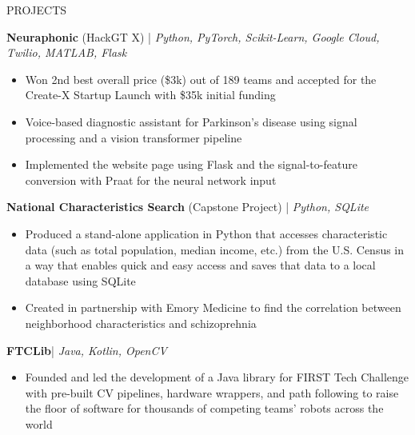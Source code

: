 \documentclass{resume} %
\begin{document}

\vspace{-0.8em}
\begin{rSection}{PROJECTS}
\vspace{-1.25em}
\item \textbf{Neuraphonic} (HackGT X) | \textit{Python, PyTorch, Scikit-Learn, Google Cloud, Twilio, MATLAB, Flask}
\vspace{-0.5em}
\begin{itemize}
   \itemsep -5pt {}
   \item Won 2nd best overall price (\$3k) out of 189 teams and accepted for the Create-X Startup Launch with \$35k
   initial funding
   \item Voice-based diagnostic assistant for Parkinson's disease using signal processing and a vision transformer pipeline
   \item Implemented the website page using Flask and the signal-to-feature conversion with Praat for the neural network input
\end{itemize}
\vspace{-0.5em}
\item \textbf{National Characteristics Search} (Capstone Project) | \textit{Python, SQLite}
\vspace{-0.5em}
\begin{itemize}
   \itemsep -5pt {}
   \item Produced a stand-alone application in Python that accesses characteristic data (such as total population, median income, etc.)
   from the U.S. Census in a way that enables quick and easy access and saves that data to a local database using SQLite
   \item Created in partnership with Emory Medicine to find the correlation between neighborhood characteristics and schizoprehnia
\end{itemize}
\vspace{-0.5em}
\item \textbf{FTCLib}| \textit{Java, Kotlin, OpenCV}
\vspace{-0.5em}
\begin{itemize}
   \itemsep -5pt {}
   \item Founded and led the development of a Java library for FIRST Tech Challenge with pre-built CV pipelines, hardware wrappers, and path following
   to raise the floor of software for thousands of competing teams' robots across the world
\end{itemize}
\end{rSection}
\end{document}

